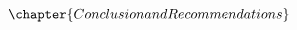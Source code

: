 \documentclass[10pt]{article}
\begin{document}
\[\renewcommand{\thechapter}{11}
\chapter{Conclusion and Recommendations}
\label{chap:conclusion}




\]
\end{document}
